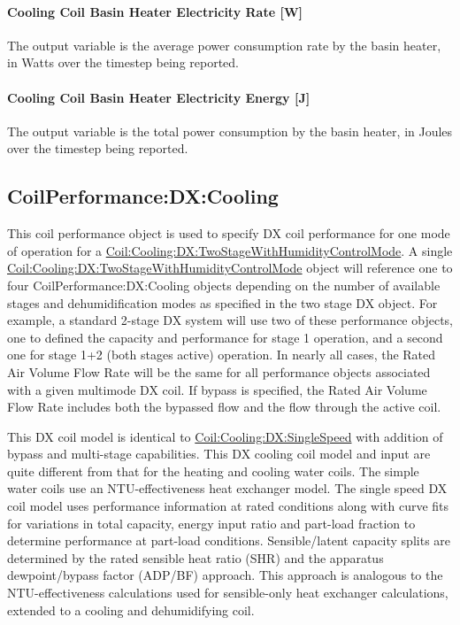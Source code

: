 \paragraph{Cooling Coil Basin Heater Electricity Rate {[}W{]}}\label{cooling-coil-basin-heater-electric-power-w-1}

The output variable is the average power consumption rate by the basin heater, in Watts over the timestep being reported.

\paragraph{Cooling Coil Basin Heater Electricity Energy {[}J{]}}\label{cooling-coil-basin-heater-electric-energy-j-1}

The output variable is the total power consumption by the basin heater, in Joules over the timestep being reported.

\subsection{CoilPerformance:DX:Cooling}\label{coilperformancedxcooling}

This coil performance object is used to specify DX coil performance for one mode of operation for a \hyperref[coilcoolingdxtwostagewithhumiditycontrolmode]{Coil:Cooling:DX:TwoStageWithHumidityControlMode}. A single \hyperref[coilcoolingdxtwostagewithhumiditycontrolmode]{Coil:Cooling:DX:TwoStageWithHumidityControlMode} object will reference one to four CoilPerformance:DX:Cooling objects depending on the number of available stages and dehumidification modes as specified in the two stage DX object. For example, a standard 2-stage DX system will use two of these performance objects, one to defined the capacity and performance for stage 1 operation, and a second one for stage 1+2 (both stages active) operation. In nearly all cases, the Rated Air Volume Flow Rate will be the same for all performance objects associated with a given multimode DX coil. If bypass is specified, the Rated Air Volume Flow Rate includes both the bypassed flow and the flow through the active coil.

This DX coil model is identical to \hyperref[coilcoolingdxsinglespeed]{Coil:Cooling:DX:SingleSpeed} with addition of bypass and multi-stage capabilities. This DX cooling coil model and input are quite different from that for the heating and cooling water coils. The simple water coils use an NTU-effectiveness heat exchanger model. The single speed DX coil model uses performance information at rated conditions along with curve fits for variations in total capacity, energy input ratio and part-load fraction to determine performance at part-load conditions. Sensible/latent capacity splits are determined by the rated sensible heat ratio (SHR) and the apparatus dewpoint/bypass factor (ADP/BF) approach. This approach is analogous to the NTU-effectiveness calculations used for sensible-only heat exchanger calculations, extended to a cooling and dehumidifying coil.

